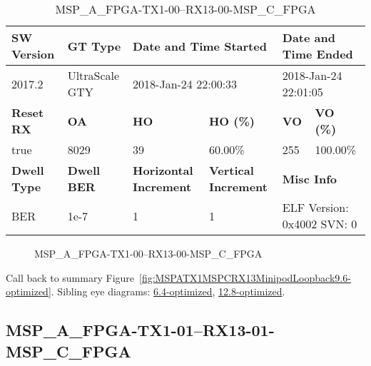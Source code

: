 \begin{table}[h]
\centering
\caption{MSP\_A\_FPGA-TX1-00--RX13-00-MSP\_C\_FPGA}
\label{tab:MSPAFPGATX100RX1300MSPCFPGA9.6-optimized}
\begin{tabular}{@{}|l|l|l|l|l|l|@{}}
\toprule
\textbf{SW Version}                & \textbf{GT Type}   & \multicolumn{2}{l|}{\textbf{Date and Time Started}}            & \multicolumn{2}{l|}{\textbf{Date and Time Ended}}        \\ \midrule
2017.2                       & UltraScale GTY          & \multicolumn{2}{l|}{2018-Jan-24 22:00:33}                   & \multicolumn{2}{l|}{2018-Jan-24 22:01:05}               \\ \midrule
\textbf{Reset RX}                  & \textbf{OA} & \textbf{HO}   & \textbf{HO (\%)} & \textbf{VO} & \textbf{VO (\%)} \\ \midrule
true & 8029        & 39          & 60.00\%        & 255        & 100.00\%       \\ \midrule
\textbf{Dwell Type}                & \textbf{Dwell BER} & \textbf{Horizontal Increment} & \textbf{Vertical Increment}    & \multicolumn{2}{l|}{\textbf{Misc Info}}                  \\ \midrule
BER                            & 1e-7        & 1        & 1           & \multicolumn{2}{l|}{ELF Version: 0x4002 SVN: 0}                         \\ \bottomrule
\end{tabular}
\end{table}

\begin{figure}[h]
\caption{MSP\_A\_FPGA-TX1-00--RX13-00-MSP\_C\_FPGA} \label{fig:MSPAFPGATX100RX1300MSPCFPGA9.6-optimized}
\end{figure}

Call back to summary Figure~\ref{fig:MSPATX1MSPCRX13MinipodLoopback9.6-optimized}.
Sibling eye diagrams: \hyperref[sec:MSPAFPGATX100RX1300MSPCFPGA6.4-optimized]{6.4-optimized}, \hyperref[sec:MSPAFPGATX100RX1300MSPCFPGA12.8-optimized]{12.8-optimized}.

\clearpage
\newpage


\subsection{MSP\_A\_FPGA-TX1-01--RX13-01-MSP\_C\_FPGA}\label{sec:MSPAFPGATX101RX1301MSPCFPGA9.6-optimized}

